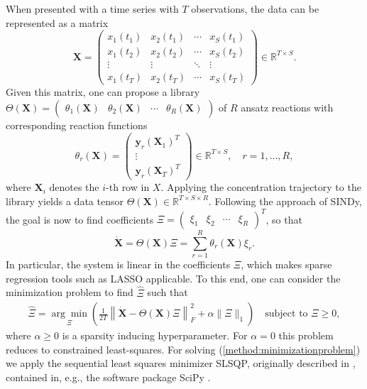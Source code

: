 \documentclass[oneside, abstracton, titlepage]{scrartcl}
\begin{document}
	When presented with a time series with $T$ observations, the data can be represented as a matrix
	\[
	\textbf{X} = \begin{pmatrix}
		x_1(t_1) & x_2(t_1) & \cdots & x_S(t_1) \\
		x_1(t_2) & x_2(t_2) & \cdots & x_S(t_2) \\
		\vdots   & \vdots   & \ddots & \vdots   \\
		x_1(t_T) & x_2(t_T) & \cdots & x_S(t_T)
	\end{pmatrix} \in \mathbb{R}^{T\times S}.
	\]
	Given this matrix, one can propose a library $\Theta(\textbf{X}) = \begin{pmatrix} \theta_1(\textbf{X}) & \theta_2(\textbf{X}) & \cdots & \theta_R(\textbf{X}) \end{pmatrix}$ of $R$ ansatz reactions with corresponding reaction functions
	\[
	\theta_r(\textbf{X}) = \begin{pmatrix}
	\textbf{y}_r(\textbf{X}_1)^T \\ \vdots \\ \textbf{y}_r(\textbf{X}_T)^T
	\end{pmatrix}\in \mathbb{R}^{T\times S},\quad r=1,\ldots,R,
	\]
	where $\textbf{X}_i$ denotes the $i$-th row in $X$. Applying the concentration trajectory to the library yields a data tensor $\Theta(\textbf{X})\in\mathbb{R}^{T\times S\times R}$. Following the approach of SINDy, the goal is now to find coefficients $\Xi = \begin{pmatrix} \xi_1 & \xi_2 & \cdots & \xi_R
	\end{pmatrix}^T$, so that
	\[
	\dot{\textbf{X}} = \Theta(\textbf{X})\Xi = \sum_{r=1}^{R}\theta_r(\textbf{X})\xi_r.
	\]
	In particular, the system is linear in the coefficients $\Xi$, which makes sparse regression tools such as LASSO \cite{Tibshirani1996, Hastie2009} applicable. To this end, one can consider the minimization problem to find $\hat{\Xi}$ such that
	\begin{align}
		\hat{\Xi} = \underset{\Xi}{\arg\min}\left( \frac{1}{2T}\left\| \dot{\textbf{X}} - \Theta(\textbf{X})\Xi \right\|_F^2 + \alpha\|\Xi\|_1 \right) \quad \text{subject to }\Xi \geq 0,
	\label{method:minimizationproblem}\end{align}
	where $\alpha\geq 0$ is a sparsity inducing hyperparameter. For $\alpha=0$ this problem reduces to constrained least-squares. For solving (\ref{method:minimizationproblem}) we apply the sequential least squares minimizer SLSQP, originally described in \cite{Kraft1988}, contained in, e.g., the software package SciPy \cite{SciPy}.
	
\end{document}
